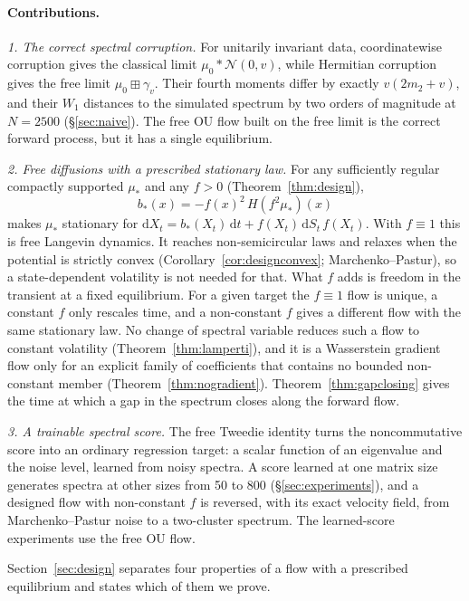 \documentclass[11pt]{article}
\newcommand{\dd}{\mathrm{d}}
\theoremstyle{plain}
\theoremstyle{definition}
\theoremstyle{remark}
\begin{document}
\paragraph{Contributions.}
\emph{1. The correct spectral corruption.} For unitarily invariant data, coordinatewise
corruption gives the classical limit $\mu_0*\mathcal N(0,v)$, while Hermitian corruption
gives the free limit $\mu_0\boxplus\gamma_v$. Their fourth moments differ by exactly
$v(2m_2+v)$, and their $W_1$ distances to the simulated spectrum by two orders of magnitude at
$N=2500$ (\S\ref{sec:naive}). The free OU flow built on the free limit is the correct forward
process, but it has a single equilibrium.

\emph{2. Free diffusions with a prescribed stationary law.} For any sufficiently regular
compactly supported $\mu_*$ and any $f>0$ (Theorem~\ref{thm:design}),
\[
  \boxed{\;b_*(x)=-f(x)^2\,H(f^2\mu_*)(x)\;}
\]
makes $\mu_*$ stationary for $\dd X_t=b_*(X_t)\,\dd t+f(X_t)\,\dd S_t\,f(X_t)$. With $f\equiv1$
this is free Langevin dynamics. It reaches non-semicircular laws and relaxes when the potential
is strictly convex (Corollary~\ref{cor:designconvex}; Marchenko--Pastur), so a state-dependent
volatility is not needed for that. What $f$ adds is freedom in the transient at a fixed equilibrium.
For a given target the $f\equiv1$ flow is unique, a constant $f$ only rescales time, and a
non-constant $f$ gives a different flow with the same stationary law. No change of spectral
variable reduces such a flow to constant volatility (Theorem~\ref{thm:lamperti}), and it is a
Wasserstein gradient flow only for an explicit family of coefficients that contains no bounded
non-constant member (Theorem~\ref{thm:nogradient}). Theorem~\ref{thm:gapclosing} gives the time at
which a gap in the spectrum closes along the forward flow.

\emph{3. A trainable spectral score.} The free Tweedie identity turns the noncommutative score into an
ordinary regression target: a scalar function of an eigenvalue and the noise level, learned from noisy spectra. A score learned at
one matrix size generates spectra at other sizes from 50 to 800 (\S\ref{sec:experiments}), and a designed flow with non-constant $f$ is
reversed, with its exact velocity field, from Marchenko--Pastur noise to a two-cluster spectrum. The learned-score experiments use
the free OU flow.

Section~\ref{sec:design} separates four properties of a flow with a prescribed equilibrium and
states which of them we prove.
\end{document}
